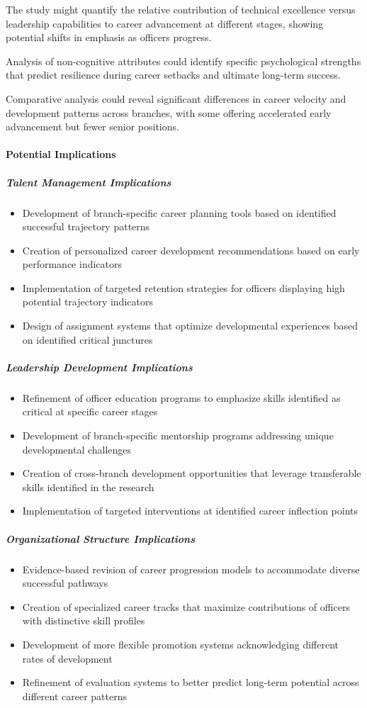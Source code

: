 \documentclass[../main.tex]{subfiles}
\begin{document}
The study might quantify the relative contribution of technical excellence versus leadership capabilities to career advancement at different stages, showing potential shifts in emphasis as officers progress.

Analysis of non-cognitive attributes could identify specific psychological strengths that predict resilience during career setbacks and ultimate long-term success.

Comparative analysis could reveal significant differences in career velocity and development patterns across branches, with some offering accelerated early advancement but fewer senior positions.

\paragraph{Potential Implications}

\subparagraph{Talent Management Implications}
\begin{itemize}
\item Development of branch-specific career planning tools based on identified successful trajectory patterns
\item Creation of personalized career development recommendations based on early performance indicators
\item Implementation of targeted retention strategies for officers displaying high potential trajectory indicators
\item Design of assignment systems that optimize developmental experiences based on identified critical junctures
\end{itemize}

\subparagraph{Leadership Development Implications}
\begin{itemize}
\item Refinement of officer education programs to emphasize skills identified as critical at specific career stages
\item Development of branch-specific mentorship programs addressing unique developmental challenges
\item Creation of cross-branch development opportunities that leverage transferable skills identified in the research
\item Implementation of targeted interventions at identified career inflection points
\end{itemize}

\subparagraph{Organizational Structure Implications}
\begin{itemize}
\item Evidence-based revision of career progression models to accommodate diverse successful pathways
\item Creation of specialized career tracks that maximize contributions of officers with distinctive skill profiles
\item Development of more flexible promotion systems acknowledging different rates of development
\item Refinement of evaluation systems to better predict long-term potential across different career patterns
\end{itemize}
\end{document}
